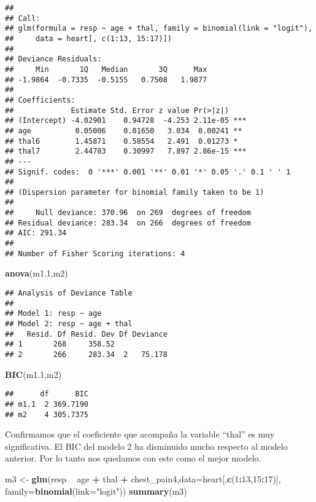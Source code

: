 \documentclass[]{article}
\newenvironment{Shaded}{\begin{snugshade}}{\end{snugshade}}
\newcommand{\KeywordTok}[1]{\textcolor[rgb]{0.13,0.29,0.53}{\textbf{#1}}}
\newcommand{\DataTypeTok}[1]{\textcolor[rgb]{0.13,0.29,0.53}{#1}}
\newcommand{\DecValTok}[1]{\textcolor[rgb]{0.00,0.00,0.81}{#1}}
\newcommand{\StringTok}[1]{\textcolor[rgb]{0.31,0.60,0.02}{#1}}
\newcommand{\OperatorTok}[1]{\textcolor[rgb]{0.81,0.36,0.00}{\textbf{#1}}}
\newcommand{\NormalTok}[1]{#1}
\begin{document}
\begin{verbatim}
## 
## Call:
## glm(formula = resp ~ age + thal, family = binomial(link = "logit"), 
##     data = heart[, c(1:13, 15:17)])
## 
## Deviance Residuals: 
##     Min       1Q   Median       3Q      Max  
## -1.9864  -0.7335  -0.5155   0.7508   1.9877  
## 
## Coefficients:
##             Estimate Std. Error z value Pr(>|z|)    
## (Intercept) -4.02901    0.94728  -4.253 2.11e-05 ***
## age          0.05006    0.01650   3.034  0.00241 ** 
## thal6        1.45871    0.58554   2.491  0.01273 *  
## thal7        2.44783    0.30997   7.897 2.86e-15 ***
## ---
## Signif. codes:  0 '***' 0.001 '**' 0.01 '*' 0.05 '.' 0.1 ' ' 1
## 
## (Dispersion parameter for binomial family taken to be 1)
## 
##     Null deviance: 370.96  on 269  degrees of freedom
## Residual deviance: 283.34  on 266  degrees of freedom
## AIC: 291.34
## 
## Number of Fisher Scoring iterations: 4
\end{verbatim}

\begin{Shaded}
\begin{Highlighting}[]
\KeywordTok{anova}\NormalTok{(m1.}\DecValTok{1}\NormalTok{,m2)}
\end{Highlighting}
\end{Shaded}

\begin{verbatim}
## Analysis of Deviance Table
## 
## Model 1: resp ~ age
## Model 2: resp ~ age + thal
##   Resid. Df Resid. Dev Df Deviance
## 1       268     358.52            
## 2       266     283.34  2   75.178
\end{verbatim}

\begin{Shaded}
\begin{Highlighting}[]
\KeywordTok{BIC}\NormalTok{(m1.}\DecValTok{1}\NormalTok{,m2)}
\end{Highlighting}
\end{Shaded}

\begin{verbatim}
##      df      BIC
## m1.1  2 369.7190
## m2    4 305.7375
\end{verbatim}

Confirmamos que el coeficiente que acompaña la variable ``thal'' es muy
significativa. El BIC del modelo 2 ha disminuido mucho respecto al
modelo anterior. Por lo tanto nos quedamos con este como el mejor
modelo.

\begin{Shaded}
\begin{Highlighting}[]
\NormalTok{m3 <-}\StringTok{  }\KeywordTok{glm}\NormalTok{(resp }\OperatorTok{~}\StringTok{ }\NormalTok{age  }\OperatorTok{+}\StringTok{ }\NormalTok{thal }\OperatorTok{+}\StringTok{ }\NormalTok{chest_pain4,}\DataTypeTok{data=}\NormalTok{heart[,}\KeywordTok{c}\NormalTok{(}\DecValTok{1}\OperatorTok{:}\DecValTok{13}\NormalTok{,}\DecValTok{15}\OperatorTok{:}\DecValTok{17}\NormalTok{)], }\DataTypeTok{family=}\KeywordTok{binomial}\NormalTok{(}\DataTypeTok{link=}\StringTok{"logit"}\NormalTok{)) }
\KeywordTok{summary}\NormalTok{(m3)}
\end{Highlighting}
\end{Shaded}
\end{document}
